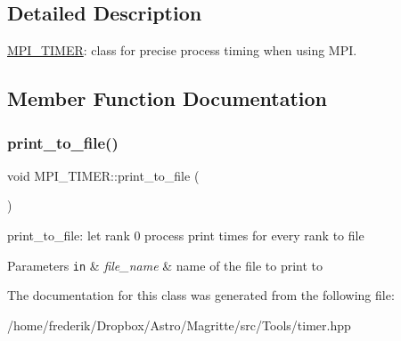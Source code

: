 \subsection{Detailed Description}
\mbox{\hyperlink{classMPI__TIMER}{M\+P\+I\+\_\+\+T\+I\+M\+ER}}\+: class for precise process timing when using M\+PI. 

\subsection{Member Function Documentation}
\mbox{\label{classMPI__TIMER_ae2b9502ad9811560bbab8032f8858b16}} 
\subsubsection{\texorpdfstring{print\+\_\+to\+\_\+file()}{print\_to\_file()}}
{\footnotesize\ttfamily void M\+P\+I\+\_\+\+T\+I\+M\+E\+R\+::print\+\_\+to\+\_\+file (\begin{DoxyParamCaption}{ }\end{DoxyParamCaption})\hspace{0.3cm}{\ttfamily [inline]}}

print\+\_\+to\+\_\+file\+: let rank 0 process print times for every rank to file 
\begin{DoxyParams}[1]{Parameters}
\mbox{\tt in}  & {\em file\+\_\+name} & name of the file to print to \\
\hline
\end{DoxyParams}


The documentation for this class was generated from the following file\+:\begin{DoxyCompactItemize}
\item 
/home/frederik/\+Dropbox/\+Astro/\+Magritte/src/\+Tools/timer.\+hpp\end{DoxyCompactItemize}
